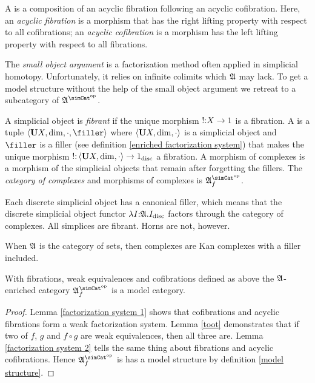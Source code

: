 \documentclass[csh.tex]{subfiles}
\begin{document}
\begin{definition} A  is a composition of an acyclic 
  fibration following an acyclic cofibration. Here, an \emph{acyclic fibration} 
  is a morphism that has the right lifting property with respect to all 
  cofibrations; an \emph{acyclic cofibration} is a morphism has the left 
  lifting property with respect to all fibrations.
\end{definition}


The \emph{small object argument} is a factorization method often applied in 
simplicial homotopy. Unfortunately, it relies on infinite colimits which 
$\mathfrak A$ may lack. To get a model structure without the help of the small 
object argument we retreat to a subcategory of $\ambient\s$.

\begin{definition} A simplicial object is \emph{fibrant} if the unique morphism $!\mathord : X\to 1$ is a fibration.
A  is a tuple $\tuplet{\base X,\dim,\cdot,\filler}$ where $\left\langle \mathbf{U} X,\dim,\cdot \right\rangle$ is a simplicial object and $\filler$ is a filler (see definition \ref{enriched factorization system}) that makes the unique morphism $!\mathord : \left\langle \mathbf{U} X,\dim,\cdot \right\rangle\to 1_{\rm disc}$ a fibration. A morphism of complexes is a morphism of the simplicial objects that remain after forgetting the fillers. The \emph{category of complexes} and morphisms of complexes is $\ambient\s\f$.
\end{definition}

\begin{example} Each discrete simplicial object has a canonical filler, which means that the discrete simplicial object functor $\lambda I\mathord :\mathfrak A .I_{\rm disc}$ factors through the category of complexes. All simplices are fibrant. Horns are not, however.
\end{example}

\begin{example} When $\mathfrak A$ is the category of sets, then complexes are Kan complexes with a filler included. \end{example}

\begin{theorem}
With fibrations, weak equivalences and cofibrations defined as above the $\mathfrak A$-enriched category $\ambient\s\f$ is a model category.
\label{model category}
\end{theorem}

\begin{proof}
Lemma \ref{factorization system 1} shows that cofibrations and acyclic fibrations form a weak factorization system. Lemma \ref{toot} demonstrates that if two of $f$, $g$ and $f\circ g$ are weak equivalences, then all three are. Lemma \ref{factorization system 2} tells the same thing about fibrations and acyclic cofibrations. Hence $\ambient\s\f$ is has a model structure by definition \ref{model structure}.
\end{proof}
\end{document}
